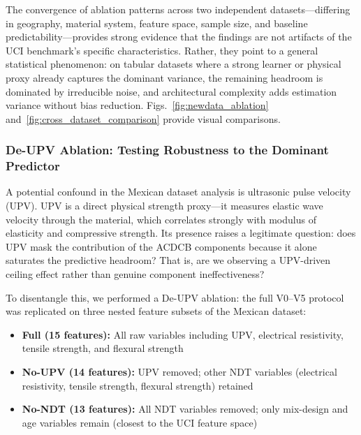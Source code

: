 \documentclass[journal]{IEEEtran}
\begin{document}
The convergence of ablation patterns across two independent datasets---differing in geography, material system, feature space, sample size, and baseline predictability---provides strong evidence that the findings are not artifacts of the UCI benchmark's specific characteristics. Rather, they point to a general statistical phenomenon: on tabular datasets where a strong learner or physical proxy already captures the dominant variance, the remaining headroom is dominated by irreducible noise, and architectural complexity adds estimation variance without bias reduction. Figs.~\ref{fig:newdata_ablation} and~\ref{fig:cross_dataset_comparison} provide visual comparisons.

\subsubsection{De-UPV Ablation: Testing Robustness to the Dominant Predictor}

A potential confound in the Mexican dataset analysis is ultrasonic pulse velocity (UPV). UPV is a direct physical strength proxy---it measures elastic wave velocity through the material, which correlates strongly with modulus of elasticity and compressive strength. Its presence raises a legitimate question: does UPV mask the contribution of the ACDCB components because it alone saturates the predictive headroom? That is, are we observing a UPV-driven ceiling effect rather than genuine component ineffectiveness?

To disentangle this, we performed a De-UPV ablation: the full V0--V5 protocol was replicated on three nested feature subsets of the Mexican dataset:

\begin{itemize}
\item \textbf{Full (15 features):} All raw variables including UPV, electrical resistivity, tensile strength, and flexural strength
\item \textbf{No-UPV (14 features):} UPV removed; other NDT variables (electrical resistivity, tensile strength, flexural strength) retained
\item \textbf{No-NDT (13 features):} All NDT variables removed; only mix-design and age variables remain (closest to the UCI feature space)
\end{itemize}
\end{document}
